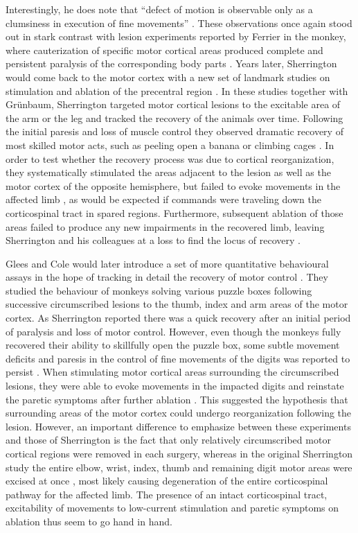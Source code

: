 Interestingly, he does note that \enquote{defect of motion is observable only as a clumsiness in execution of fine movements} \cite{Sherrington1885}. These observations once again stood out in stark contrast with lesion experiments reported by Ferrier in the monkey, where cauterization of specific motor cortical areas produced complete and persistent paralysis of the corresponding body parts \cite{Ferrier1884}. Years later, Sherrington would come back to the motor cortex with a new set of landmark studies on stimulation and ablation of the precentral region \cite{GrahamBrown1913,Leyton1917}. In these studies together with Gr\"unbaum, Sherrington targeted motor cortical lesions to the excitable area of the arm or the leg and tracked the recovery of the animals over time. Following the initial paresis and loss of muscle control they observed dramatic recovery of most skilled motor acts, such as peeling open a banana or climbing cages \cite{Leyton1917}. In order to test whether the recovery process was due to cortical reorganization, they systematically stimulated the areas adjacent to the lesion as well as the motor cortex of the opposite hemisphere, but failed to evoke movements in the affected limb \cite{Leyton1917}, as would be expected if commands were traveling down the corticospinal tract in spared regions. Furthermore, subsequent ablation of those areas failed to produce any new impairments in the recovered limb, leaving Sherrington and his colleagues at a loss to find the locus of recovery \cite{Leyton1917}.

Glees and Cole would later introduce a set of more quantitative behavioural assays in the hope of tracking in detail the recovery of motor control \cite{Glees1950,Cole1952}. They studied the behaviour of monkeys solving various puzzle boxes following successive circumscribed lesions to the thumb, index and arm areas of the motor cortex. As Sherrington reported there was a quick recovery after an initial period of paralysis and loss of motor control. However, even though the monkeys fully recovered their ability to skillfully open the puzzle box, some subtle movement deficits and paresis in the control of fine movements of the digits was reported to persist \cite{Glees1950}. When stimulating motor cortical areas surrounding the circumscribed lesions, they were able to evoke movements in the impacted digits and reinstate the paretic symptoms after further ablation \cite{Glees1950}. This suggested the hypothesis that surrounding areas of the motor cortex could undergo reorganization following the lesion. However, an important difference to emphasize between these experiments and those of Sherrington is the fact that only relatively circumscribed motor cortical regions were removed in each surgery, whereas in the original Sherrington study the entire elbow, wrist, index, thumb and remaining digit motor areas were excised at once \cite{Leyton1917}, most likely causing degeneration of the entire corticospinal pathway for the affected limb. The presence of an intact corticospinal tract, excitability of movements to low-current stimulation and paretic symptoms on ablation thus seem to go hand in hand.

